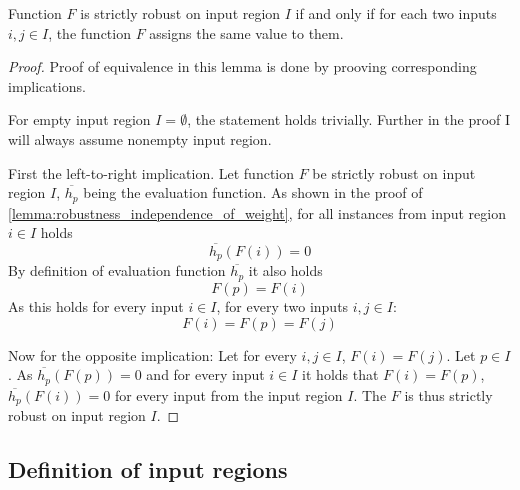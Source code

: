 \begin{lemma}{Function $F$ is strictly robust on input region $I$
    if and only if for each two inputs $i, j\in I$, the function $F$ assigns the same value to them.}
    \begin{proof}
        Proof of equivalence in this lemma is done
        by prooving corresponding implications.

        For empty input region $I=\emptyset$, the statement holds trivially.
        Further in the proof I will always assume nonempty input region.

        First the left-to-right implication.
        Let function $F$ be strictly robust on input region $I$,
        $\overline{h_p}$ being the evaluation function.
        As shown in the proof of \cref{lemma:robustness_independence_of_weight},
        for all instances from input region $i\in I$ holds
        \begin{equation*}
            \overline{h_p}(F(i)) = 0
        \end{equation*}
        By definition of evaluation function $\overline{h_p}$ it also holds
        \begin{equation*}
            F(p) = F(i)
        \end{equation*}
        As this holds for every input $i\in I$, for every two inputs $i, j\in I$:
        \begin{equation*}
            F(i) = F(p) = F(j)
        \end{equation*}

        Now for the opposite implication: Let for every $i, j\in I$, $F(i) = F(j)$.
        Let $p\in I$. As $\overline{h_p}(F(p)) = 0$
        and for every input $i\in I$ it holds that $F(i) = F(p)$,
        $\overline{h_p}(F(i)) = 0$ for every input from the input region $I$.
        The $F$ is thus strictly robust on input region $I$.
    \end{proof}
\end{lemma}



\subsection{Definition of input regions}

